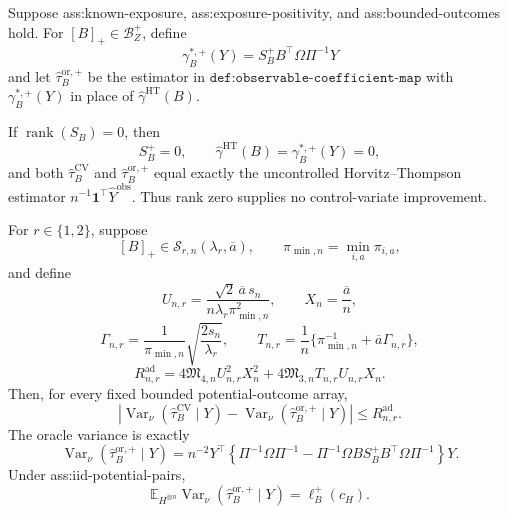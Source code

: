 Suppose ass:known-exposure, ass:exposure-positivity, and ass:bounded-outcomes hold.  For \([B]_+\in\mathcal B_Z^+\), define
\[
\gamma_B^{*,+}(Y)=S_B^+B^{\top}\Omega\Pi^{-1}Y
\]
and let \(\widehat\tau_B^{\mathrm{or},+}\) be the estimator in \(\texttt{def:observable-coefficient-map}\) with \(\gamma_B^{*,+}(Y)\) in place of \(\widehat\gamma^{\mathrm{HT}}(B)\).

If \(\operatorname{rank}(S_B)=0\), then
\[
S_B^+=0,
\qquad
\widehat\gamma^{\mathrm{HT}}(B)=\gamma_B^{*,+}(Y)=0,
\]
and both \(\widehat\tau_B^{\mathrm{CV}}\) and \(\widehat\tau_B^{\mathrm{or},+}\) equal exactly the uncontrolled Horvitz--Thompson estimator \(n^{-1}\mathbf1^{\top}\widehat Y^{\mathrm{obs}}\).  Thus rank zero supplies no control-variate improvement.

For \(r\in\{1,2\}\), suppose
\[
[B]_+\in\mathcal S_{r,n}(\lambda_r,\overline a),
\qquad
\pi_{\min,n}=\min_{i,a}\pi_{i,a},
\]
and define
\[
U_{n,r}=\frac{\sqrt2\,\overline a\,s_n}
{n\lambda_r\pi_{\min,n}^2},
\qquad X_n=\frac{\overline a}{n},
\]
\[
\Gamma_{n,r}=\frac1{\pi_{\min,n}}
\sqrt{\frac{2s_n}{\lambda_r}},
\qquad
T_{n,r}=\frac1n\{\pi_{\min,n}^{-1}
+\overline a\Gamma_{n,r}\},
\]
\[
R_{n,r}^{\mathrm{ad}}
=4\mathfrak M_{4,n}U_{n,r}^2X_n^2
+4\mathfrak M_{3,n}T_{n,r}U_{n,r}X_n.
\]
Then, for every fixed bounded potential-outcome array,
\[
\left|\operatorname{Var}_\nu(\widehat\tau_B^{\mathrm{CV}}\mid Y)
-\operatorname{Var}_\nu(\widehat\tau_B^{\mathrm{or},+}\mid Y)\right|
\le R_{n,r}^{\mathrm{ad}}.
\]
The oracle variance is exactly
\[
\operatorname{Var}_\nu(\widehat\tau_B^{\mathrm{or},+}\mid Y)
=n^{-2}Y^{\top}\left\{\Pi^{-1}\Omega\Pi^{-1}
-\Pi^{-1}\Omega B S_B^+B^{\top}\Omega\Pi^{-1}\right\}Y.
\]
Under ass:iid-potential-pairs,
\[
\mathbb E_{H^{\otimes n}}
\operatorname{Var}_\nu(\widehat\tau_B^{\mathrm{or},+}\mid Y)
=\ell_B^+(c_H).
\]

